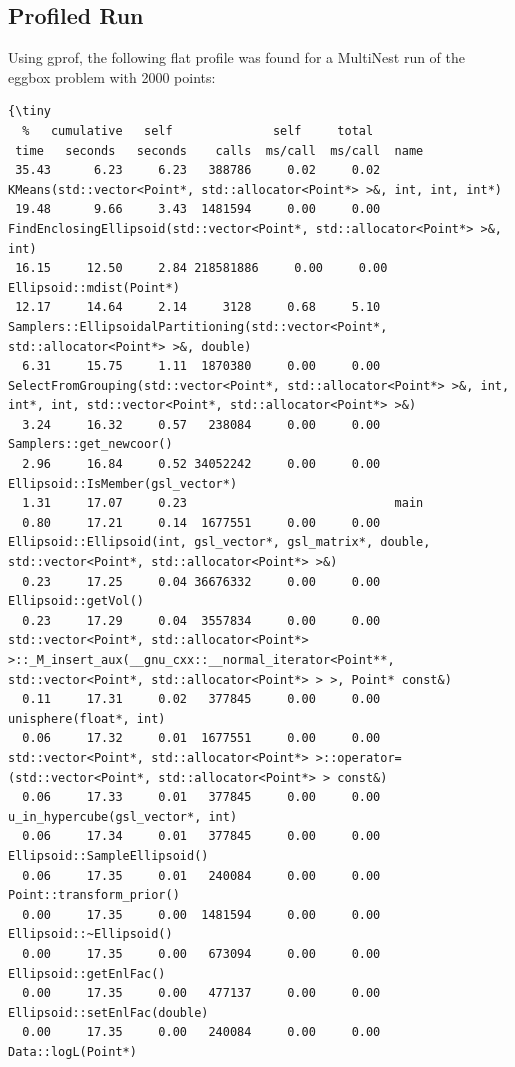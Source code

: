 \documentclass{article}
\begin{document}
\subsection{Profiled Run}
Using gprof, the following flat profile was found for a MultiNest run of the eggbox problem with 2000 points:

\begin{verbatim}
{\tiny
  %   cumulative   self              self     total           
 time   seconds   seconds    calls  ms/call  ms/call  name    
 35.43      6.23     6.23   388786     0.02     0.02  KMeans(std::vector<Point*, std::allocator<Point*> >&, int, int, int*)
 19.48      9.66     3.43  1481594     0.00     0.00  FindEnclosingEllipsoid(std::vector<Point*, std::allocator<Point*> >&, int)
 16.15     12.50     2.84 218581886     0.00     0.00  Ellipsoid::mdist(Point*)
 12.17     14.64     2.14     3128     0.68     5.10  Samplers::EllipsoidalPartitioning(std::vector<Point*, std::allocator<Point*> >&, double)
  6.31     15.75     1.11  1870380     0.00     0.00  SelectFromGrouping(std::vector<Point*, std::allocator<Point*> >&, int, int*, int, std::vector<Point*, std::allocator<Point*> >&)
  3.24     16.32     0.57   238084     0.00     0.00  Samplers::get_newcoor()
  2.96     16.84     0.52 34052242     0.00     0.00  Ellipsoid::IsMember(gsl_vector*)
  1.31     17.07     0.23                             main
  0.80     17.21     0.14  1677551     0.00     0.00  Ellipsoid::Ellipsoid(int, gsl_vector*, gsl_matrix*, double, std::vector<Point*, std::allocator<Point*> >&)
  0.23     17.25     0.04 36676332     0.00     0.00  Ellipsoid::getVol()
  0.23     17.29     0.04  3557834     0.00     0.00  std::vector<Point*, std::allocator<Point*> >::_M_insert_aux(__gnu_cxx::__normal_iterator<Point**, std::vector<Point*, std::allocator<Point*> > >, Point* const&)
  0.11     17.31     0.02   377845     0.00     0.00  unisphere(float*, int)
  0.06     17.32     0.01  1677551     0.00     0.00  std::vector<Point*, std::allocator<Point*> >::operator=(std::vector<Point*, std::allocator<Point*> > const&)
  0.06     17.33     0.01   377845     0.00     0.00  u_in_hypercube(gsl_vector*, int)
  0.06     17.34     0.01   377845     0.00     0.00  Ellipsoid::SampleEllipsoid()
  0.06     17.35     0.01   240084     0.00     0.00  Point::transform_prior()
  0.00     17.35     0.00  1481594     0.00     0.00  Ellipsoid::~Ellipsoid()
  0.00     17.35     0.00   673094     0.00     0.00  Ellipsoid::getEnlFac()
  0.00     17.35     0.00   477137     0.00     0.00  Ellipsoid::setEnlFac(double)
  0.00     17.35     0.00   240084     0.00     0.00  Data::logL(Point*)

\end{verbatim}
\end{document}

